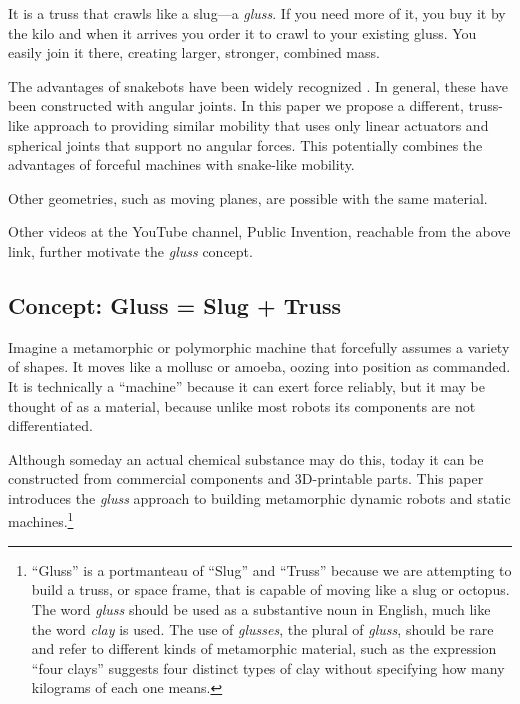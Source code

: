 \documentclass[11pt]{article}
\begin{document}
It is a truss that crawls like a slug---a \emph{gluss}.
If you need more of it, you buy it by the kilo and when it arrives you order it
to crawl to your existing gluss. You easily join it there, creating 
larger, stronger, combined mass.

The advantages of snakebots have been widely recognized \cite{liljebäck2012snake}. In general, these have been constructed
with angular joints. In this paper we propose a different, truss-like approach to providing similar
mobility that uses only linear actuators and spherical joints that support no angular forces. This
potentially combines the advantages of forceful machines with snake-like mobility.

Other geometries, such as moving planes, are possible with the same material.

Other videos at the YouTube channel, Public Invention, reachable from the above link,
further motivate the \emph{gluss} concept.


\subsection{Concept: Gluss = Slug + Truss}

Imagine a metamorphic or polymorphic machine that forcefully assumes a variety of shapes. It moves like a mollusc or amoeba,
oozing into position as commanded. It is technically a ``machine'' because it can exert force reliably, but
it may be thought of as a material, because unlike most robots its components are not differentiated.

Although someday an actual chemical substance may do this, today it can be constructed from commercial components
and 3D-printable parts. This paper introduces the \emph{gluss} approach to building metamorphic dynamic robots
and static machines.\footnote{ ``Gluss'' is a portmanteau of ``Slug'' and ``Truss'' because we are attempting to
build a truss, or space frame, that is capable of moving like a slug or octopus.
The word \textit{gluss}
should be used as a substantive noun in English, much like the word \textit{clay} is used.
The use of \textit{glusses}, the plural
of \textit{gluss}, should be rare and refer to different kinds of metamorphic material, such as the expression
``four clays'' suggests four distinct types of clay without specifying how many kilograms of each one means.}
\end{document}
